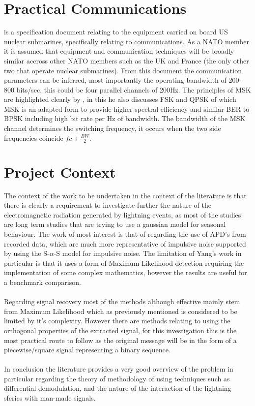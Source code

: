 \section{Practical Communications}
\cite{appendixA} is a specification document relating to the equipment carried on board US nuclear submarines, specifically relating to communications. As a NATO member it is assumed that equipment and communication techniques will be broadly similar accross other NATO members such as the UK and France (the only other two that operate nuclear submarines). From this document the communication parameters can be inferred, most importantly the operating bandwidth of 200-800 bits/sec, this could be four parallel channels of 200Hz. The principles of MSK are highlighted clearly by \cite{Pasupathy1979}, in this he also discusses FSK and QPSK of which MSK is an adapted form to provide higher spectral efficiency and similar BER to BPSK including high bit rate per Hz of bandwidth. 
The bandwidth of the MSK channel determines the switching frequency, it occurs when the two side frequencies coincide $fc\pm\frac{BW}{2}$.

\section{Project Context}
The context of the work to be undertaken in the context of the literature is that there is clearly a requirement to investigate further the nature of the electromagnetic radiation generated by lightning events, as most of the studies are long term studies that are trying to use a gaussian model for seasonal behaviour. The work of most interest is that of \cite{Chrissan2000} regarding the use of APD's from recorded data, which are much more representative of impulsive noise supported by \cite{Yang2016} using the S-$\alpha$-S model for impulsive noise. The limitation of Yang's work in particular is that it uses a form of Maximum Likelihood detection requiring the implementation of some complex mathematics, however the results are useful for a benchmark comparison. 
\\\\
Regarding signal recovery most of the methods although effective mainly stem from Maximum Likelihood which as previously mentioned is considered to be limited by it's complexity. However there are methods relating to using the orthogonal properties of the extracted signal, for this investigation this is the most practical route to follow as the original message will be in the form of a piecewise/square signal representing a binary sequence.
\\\\
In conclusion the literature provides a very good overview of the problem in particular regarding the theory of methodology of using techniques such as differential demodulation, and the nature of the interaction of the lightning sferics with man-made signals.